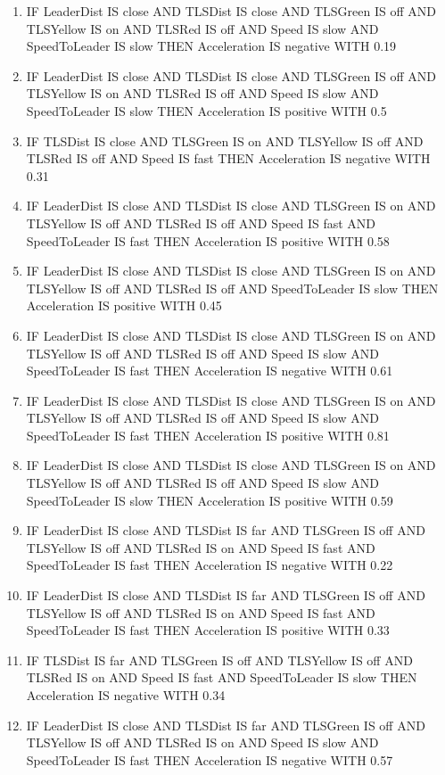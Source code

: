 \begin{enumerate}
	\item IF LeaderDist IS close AND TLSDist IS close AND TLSGreen IS off AND TLSYellow IS on AND TLSRed IS off AND Speed IS slow AND SpeedToLeader IS slow THEN Acceleration IS negative WITH 0.19
	\item IF LeaderDist IS close AND TLSDist IS close AND TLSGreen IS off AND TLSYellow IS on AND TLSRed IS off AND Speed IS slow AND SpeedToLeader IS slow THEN Acceleration IS positive WITH 0.5
	\item IF TLSDist IS close AND TLSGreen IS on AND TLSYellow IS off AND TLSRed IS off AND Speed IS fast THEN Acceleration IS negative WITH 0.31
	\item IF LeaderDist IS close AND TLSDist IS close AND TLSGreen IS on AND TLSYellow IS off AND TLSRed IS off AND Speed IS fast AND SpeedToLeader IS fast THEN Acceleration IS positive WITH 0.58
	\item IF LeaderDist IS close AND TLSDist IS close AND TLSGreen IS on AND TLSYellow IS off AND TLSRed IS off AND SpeedToLeader IS slow THEN Acceleration IS positive WITH 0.45
	\item IF LeaderDist IS close AND TLSDist IS close AND TLSGreen IS on AND TLSYellow IS off AND TLSRed IS off AND Speed IS slow AND SpeedToLeader IS fast THEN Acceleration IS negative WITH 0.61
	\item IF LeaderDist IS close AND TLSDist IS close AND TLSGreen IS on AND TLSYellow IS off AND TLSRed IS off AND Speed IS slow AND SpeedToLeader IS fast THEN Acceleration IS positive WITH 0.81
	\item IF LeaderDist IS close AND TLSDist IS close AND TLSGreen IS on AND TLSYellow IS off AND TLSRed IS off AND Speed IS slow AND SpeedToLeader IS slow THEN Acceleration IS positive WITH 0.59
	\item IF LeaderDist IS close AND TLSDist IS far AND TLSGreen IS off AND TLSYellow IS off AND TLSRed IS on AND Speed IS fast AND SpeedToLeader IS fast THEN Acceleration IS negative WITH 0.22
	\item IF LeaderDist IS close AND TLSDist IS far AND TLSGreen IS off AND TLSYellow IS off AND TLSRed IS on AND Speed IS fast AND SpeedToLeader IS fast THEN Acceleration IS positive WITH 0.33
	\item IF TLSDist IS far AND TLSGreen IS off AND TLSYellow IS off AND TLSRed IS on AND Speed IS fast AND SpeedToLeader IS slow THEN Acceleration IS negative WITH 0.34
	\item IF LeaderDist IS close AND TLSDist IS far AND TLSGreen IS off AND TLSYellow IS off AND TLSRed IS on AND Speed IS slow AND SpeedToLeader IS fast THEN Acceleration IS negative WITH 0.57

\end{enumerate}
